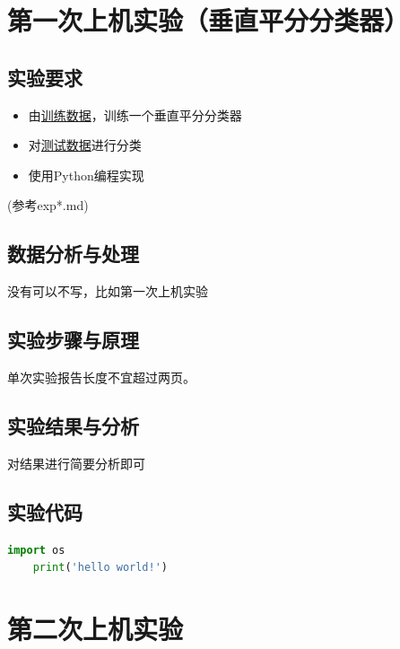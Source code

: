 \documentclass[a4paper,12pt]{report}
\begin{document}
\tableofcontents %

\chapter{第一次上机实验（垂直平分分类器）}
\section{实验要求}
\begin{itemize}
    \item 由\href{https://github.com/mercier111/Data_mining_2021/blob/main/data/2021_0325/data/train.txt}{训练数据}，训练一个垂直平分分类器
    \item 对\href{https://github.com/mercier111/Data_mining_2021/blob/main/data/2021_0325/data/test.txt}{测试数据}进行分类
    \item 使用Python编程实现
\end{itemize}
\par (参考exp*.md)
\section{数据分析与处理}
\par 没有可以不写，比如第一次上机实验
\section{实验步骤与原理}
\par 单次实验报告长度不宜超过两页。
\section{实验结果与分析}
\par 对结果进行简要分析即可
\section{实验代码}
\begin{lstlisting}[language=Python]
    import os 
    print('hello world!')
\end{lstlisting}
\clearpage
\chapter{第二次上机实验}
\end{document}
